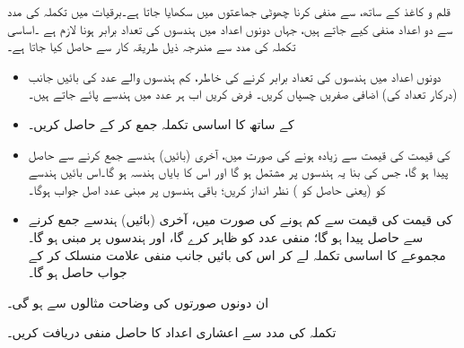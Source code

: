 قلم و کاغذ  کے ساتھ،   سے   منفی کرنا چھوٹی جماعتوں میں سکھایا جاتا ہے۔برقیات  میں تکملہ کی مدد سے دو اعداد منفی کیے جاتے ہیں، جہاں دونوں اعداد میں ہندسوں کی تعداد برابر ہونا لازم ہے ۔اساسی تکملہ  کی مدد سے     مندرجہ ذیل طریقہ کار سے حاصل کیا جاتا ہے۔
\begin{itemize}
    \item
     دونوں  اعداد میں ہندسوں کی تعداد   برابر  کرنے کی خاطر،  کم ہندسوں  والے   عدد کی بائیں جانب  (درکار تعداد کی) اضافی صفریں  چسپاں کریں۔ فرض کریں اب ہر عدد میں     ہندسے پائے جاتے ہیں۔ 
    \item
     کے ساتھ    کا اساسی تکملہ جمع کر کے       حاصل کریں۔
   \item
        کی قیمت    کی قیمت سے زیادہ ہونے کی صورت میں، آخری  (بائیں)  ہندسے جمع کرنے سے  حاصل   پیدا ہو  گا،  جس کی بنا  یہ    ہندسوں پر مشتمل  ہو گا اور اس کا  بایاں ہندسہ         ہو گا۔اس  بائیں ہندسے    کو (یعنی حاصل  کو )  نظر انداز کریں؛ باقی    ہندسوں پر مبنی عدد اصل جواب ہوگا۔
    \item
{}کی قیمت   کی قیمت سے کم  ہونے کی صورت میں،  آخری  (بائیں)  ہندسے جمع کرنے سے  حاصل   پیدا    ہو  گا؛        منفی عدد کو ظاہر کرے گا، اور  ہندسوں  پر مبنی ہو گا۔مجموعے کا اساسی تکملہ لے کر اس کی بائیں جانب  منفی علامت  منسلک  کر کے  جواب  حاصل ہو گا۔
\end{itemize}
ان  دونوں صورتوں کی وضاحت مثالوں  سے ہو  گی۔ 

  تکملہ    کی مدد سے اعشاری اعداد  کا حاصل منفی     دریافت  کریں۔ 
 

